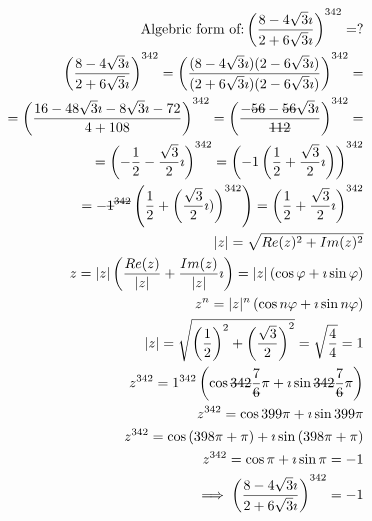 \documentclass{article}
\newcommand{\stkout}[1]{\ifmmode\text{\sout{\ensuremath{#1}}}\else\sout{#1}\fi}
\begin{document}
    \begin{align*}
        \text{Algebric form of:} \left(\frac{8 - 4\sqrt3\imath}{2 + 6\sqrt3\imath}\right)^{342} = ?\\
        \left(\frac{8 - 4\sqrt3\imath}{2 + 6\sqrt3\imath}\right)^{342} =
        \left(\frac{(8 - 4\sqrt3\imath)(2 - 6\sqrt3\imath)}{(2 + 6\sqrt3\imath)(2 - 6\sqrt3\imath)}\right)^{342} =\\
        = \left(\frac{16 - 48\sqrt3\imath - 8\sqrt3\imath - 72}{4 + 108}\right)^{342}
        = \left(\frac{-\stkout{56} - \stkout{56}\sqrt3\imath}{\stkout{112}}\right)^{342} =\\
        = \left(-\frac{1}{2} -\frac{\sqrt3}{2}\imath\right)^{342}
        = \left(-1 \left( \frac{1}{2} + \frac{\sqrt3}{2}\imath\right) \right)^{342}\\
        = -\stkout{1} ^ {\stkout{342}} \left( \frac{1}{2} + \left(\frac{\sqrt3}{2}\imath)\right) ^ {342}\right)
        = \left(\frac{1}{2} + \frac{\sqrt3}{2}\imath\right)^{342}\\
        |z| = \sqrt{Re(z) ^ 2 + Im(z) ^ 2}\\
        z  = |z|\left(\frac{ Re(z) }{|z|} + \frac{Im(z)}{|z|}\imath\right) = |z|\left(\cos\varphi + \imath\sin\varphi\right)\\
        z ^ n  = |z| ^ n\left(\cos{n\varphi} + \imath\sin{n\varphi}\right)\\
        |z| = \sqrt{\left(\frac{1}{2}\right) ^ 2 + \left(\frac{\sqrt3}{2}\right) ^ 2} = \sqrt{\frac{4}{4}} = 1\\
        z ^ {342} = 1 ^ {342}\left(\cos{\stkout{342}\frac{7}{\stkout{6}}\pi} + \imath\sin{\stkout{342}\frac{7}{\stkout{6}}\pi}\right)\\
        z ^ {342} = \cos{399\pi} + \imath\sin{399\pi}\\
        z ^ {342} = \cos{(398\pi + \pi)} + \imath\sin{(398\pi + \pi)}\\
        z ^ {342} = \cos{\pi} + \imath\sin{\pi} = -1\\
        \implies \left(\frac{8 - 4\sqrt3\imath}{2 + 6\sqrt3\imath}\right)^{342} = -1
    \end{align*}
\end{document}
